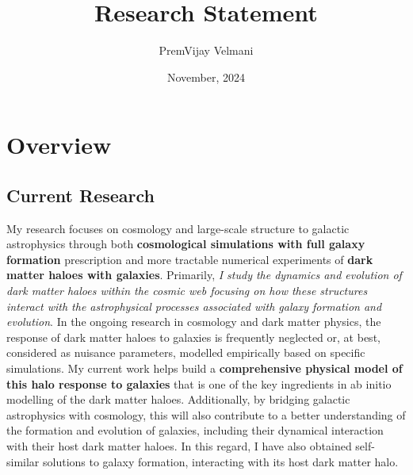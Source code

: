 \documentclass[10pt]{article}
\title{Research Statement}
\author{PremVijay Velmani}
\date{November, 2024}
\begin{document}
\maketitle




\section{Overview}
\subsection{Current Research}
My research focuses on cosmology and large-scale structure to galactic astrophysics through both \textbf{cosmological simulations with full galaxy formation} prescription and more tractable numerical experiments of \textbf{dark matter haloes with galaxies}. Primarily, \textit{I study the dynamics and evolution of dark matter haloes within the cosmic web focusing on how these structures interact with the astrophysical processes associated with galaxy formation and evolution}. In the ongoing research in cosmology and dark matter physics, the response of dark matter haloes to galaxies is frequently neglected or, at best, considered as nuisance parameters, modelled empirically based on specific simulations. 
My current work helps build a \textbf{comprehensive physical model of this halo response to galaxies} that is one of the key ingredients in ab initio modelling of the dark matter haloes. Additionally, by bridging galactic astrophysics with cosmology, this will also contribute to a better understanding of the formation and evolution of galaxies, including their dynamical interaction with their host dark matter haloes. In this regard, I have also obtained self-similar solutions to galaxy formation, interacting with its host dark matter halo.
\end{document}
